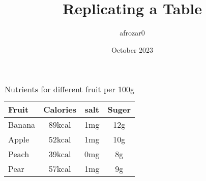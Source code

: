 \documentclass{article}
\title{Replicating a Table}
\author{afrozar0 }
\date{October 2023}
\begin{document}
\maketitle
\begin{table}[h]
    \centering
    \begin{tabular}{l|c c c}
       Fruit & Calories & salt & Suger \\
       \hline
         Banana & 89kcal & 1mg & 12g  \\
         Apple  & 52kcal & 1mg & 10g \\
         Peach  & 39kcal & 0mg & 8g\\
         Pear   & 57kcal & 1mg & 9g
          
    \end{tabular}
    \caption{Nutrients for different fruit per 100g}
    \label{tab:my_label}
\end{table}
\end{document}
